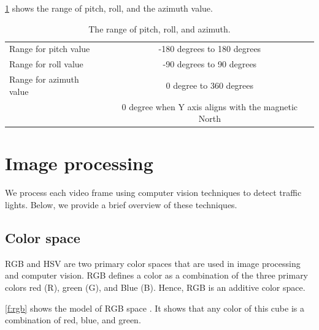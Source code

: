 \ref{t:rpy} shows the range of pitch, roll, and the azimuth value.
\begin{table}[h!]
  \centering
  \caption{The range of pitch, roll, and azimuth.}
  \label{t:rpy}
  \begin{tabular}{  l   c  }
    \rowcolor{gray!50}
    \hline
    Range for pitch value & -180 degrees to 180 degrees \\
    Range for roll value & -90 degrees to 90 degrees  \\
    Range for azimuth value & 0 degree to 360 degrees \\
    \rowcolor{gray!50}
    & 0 degree when Y axis aligns with the magnetic North \\
    
  \end{tabular}
\end{table}


\section {Image processing}
We process each video frame using computer vision techniques to detect traffic lights. 
Below, we provide a brief overview of these techniques. 

\subsection{Color space}
\label{s:color_space}
RGB \cite{rgb} and HSV \cite{hsv} are two primary color spaces that are used in image processing and computer vision.
RGB defines a color as a combination of the three primary colors red (R), green (G), and Blue (B).
Hence, RGB is an additive color space.

\ref{f:rgb} shows the model of RGB space \cite{rgb}.
It shows that any color of this cube is a combination of red, blue, and green.

